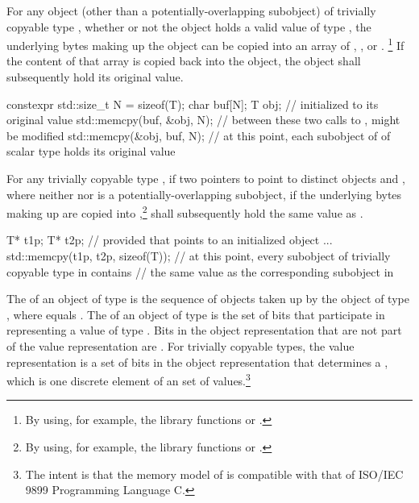 \pnum
{}%
%
For any object (other than a potentially-overlapping subobject) of trivially copyable type
, whether or not the object holds a valid value of type
, the underlying bytes making up the
object can be copied into an array of
,
, or
.%
\footnote{By using, for example, the library
functions  or .}
If the content of that array
is copied back into the object, the object shall
subsequently hold its original value.
\begin{example}
\begin{codeblock}
constexpr std::size_t N = sizeof(T);
char buf[N];
T obj;                          //  initialized to its original value
std::memcpy(buf, &obj, N);      // between these two calls to ,  might be modified
std::memcpy(&obj, buf, N);      // at this point, each subobject of  of scalar type holds its original value
\end{codeblock}
\end{example}

\pnum
For any trivially copyable type , if two pointers to  point to
distinct  objects  and , where neither
 nor  is a potentially-overlapping subobject, if the underlying
bytes making up
 are copied into ,\footnote{By using, for example,
the library functions  or .}
  shall subsequently hold the same value as
.
\begin{example}
\begin{codeblock}
T* t1p;
T* t2p;
    // provided that  points to an initialized object ...
std::memcpy(t1p, t2p, sizeof(T));
    // at this point, every subobject of trivially copyable type in  contains
    // the same value as the corresponding subobject in 
\end{codeblock}
\end{example}

\pnum
The 
of an object of type  is the
sequence of   objects taken up
by the object of type , where  equals
.
The 
of an object of type  is the set of bits
that participate in representing a value of type .
Bits in the object representation that are not part of the value representation
are .
For trivially copyable types, the value representation is
a set of bits in the object representation that determines a
, which is one discrete element of an
 set of values.\footnote{The
intent is that the memory model of \Cpp{} is compatible
with that of ISO/IEC 9899 Programming Language C.}


